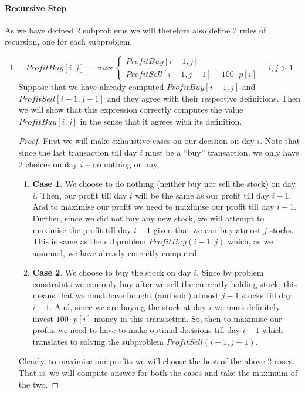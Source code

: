 \documentclass[answers]{exam}
\begin{document}
\begin{questions}
\begin{solution}
\paragraph{Recursive Step}
As we have defined 2 subproblems we will therefore also define 2 rules of recursion, one for each subproblem.
\begin{enumerate}
    \item
    \[
        ProfitBuy[i, j] = \max
        \begin{cases}
            ProfitBuy[i-1, j]\\
            ProfitSell[i-1, j-1] - 100 \cdot p[i]
        \end{cases}
        \quad i,j > 1
    \]
    Suppose that we have already computed $ProfitBuy[i-1, j]$ and $ProfitSell[i-1, j-1]$ and they agree with their respective definitions. Then we will show that this expression correctly computes the value $ProfitBuy[i, j]$ in the sense that it agrees with its definition.
    \begin{proof}
    First we will make exhaustive cases on our decision on day $i$. Note that since the last transaction till day $i$ must be a ``buy'' transaction, we only have 2 choices on day $i$ -- do nothing or buy.
    \begin{enumerate}
        \item \textbf{Case 1}. We choose to do nothing (neither buy nor sell the stock) on day $i$. Then, our profit till day $i$ will be the same as our profit till day $i-1$. And to maximise our profit we need to maximise our profit till day $i-1$. Further, since we did not buy any new stock, we will attempt to maximise the profit till day $i-1$ given that we can buy atmost $j$ stocks. This is same as the subproblem $ProfitBuy(i-1, j)$ which, as we assumed, we have already correctly computed.
        \item \textbf{Case 2}. We choose to buy the stock on day $i$. Since by problem constraints we can only buy after we sell the currently holding stock, this means that we must have bought (and sold) atmost $j-1$ stocks till day $i-1$. And, since we are buying the stock at day $i$ we must definitely invest $100 \cdot p[i]$ money in this transaction. So, then to maximise our profits we need to have to make optimal decisions till day $i-1$ which translates to solving the subproblem $ProfitSell(i-1, j-1)$.
    \end{enumerate}
    Clearly, to maximise our profits we will choose the best of the above 2 cases. That is, we will compute answer for both the cases and take the maximum of the two.

\end{proof}
\end{enumerate}
\end{solution}
\end{questions}
\end{document}
